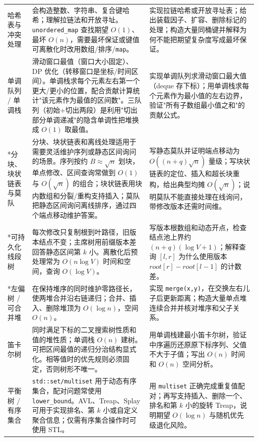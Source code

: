 \documentclass[a4paper,11pt]{article}
\newcommand{\code}[1]{\texttt{#1}}
\begin{document}
\begin{longtable}{L{2.4cm} L{7.5cm} L{6.8cm}}
哈希表与冲突处理
& 会构造整数、字符串、复合键哈希；理解拉链法和开放寻址。\code{unordered\_map} 查找期望 $O(1)$、最坏 $O(n)$，需要最坏保证或键值可离散化时改用数组/排序/\code{map}。
& 实现拉链哈希或开放寻址表；给出装载因子、扩容、删除标记的处理；构造大量同桶键并解释为何不能把期望复杂度写成最坏保证。\\[2mm]

单调队列 / 单调栈
& 滑动窗口最值（窗口大小固定）、DP 优化（转移窗口是坐标/时间区间）。单调栈求每个元素左右第一个更大/更小的位置，配合贡献计算统计"该元素作为最值的区间数"。三队列（初始+切出两段）是利用"切出部分单调递减"的隐含单调性把堆换成 $O(1)$ 取最值。
& 实现单调队列求滑动窗口最大值（deque 存下标）；用单调栈求每个元素作为最小值的左右边界，验证"所有子数组最小值之和"的贡献公式。\\[2mm]

*分块、块状链表与莫队
& 分块、块状链表和离线处理适用于需要灵活维护序列或静态区间询问的场景。序列按约 $B\approx\sqrt n$ 划块，单点修改、区间查询常做到 $O(1)$ 与 $O(\sqrt n)$ 的组合；块状链表用块内数组和分裂/重构支持插入；莫队把静态区间询问离线排序，通过四个端点移动维护答案。
& 写静态莫队并证明端点移动为 $O((n+q)\sqrt n)$ 量级；写块状链表的定位、插入和超长块重构，给出典型均摊 $O(\sqrt n)$；说明莫队不能直接处理在线询问，带修改版本还需时间维。\\[2mm]

*可持久化线段树
& 每次修改只复制根到叶路径，旧版本结点不变；主席树用前缀版本差回答静态区间第 $k$ 小。离散化后预处理常为 $O(n\log V)$ 时间和空间，查询 $O(\log V)$。
& 写版本根数组和动态开点，检查结点池上界约 $(n+q)(\log V+1)$；解释查询 $[l,r]$ 为什么使用版本 $root[r]-root[l-1]$ 的计数差。\\[2mm]

*左偏树 / 可合并堆
& 在保持堆序的同时维护零路径长，使两堆合并沿右链递归；合并、插入、删除堆顶为 $O(\log n)$，空间 $O(n)$。
& 实现 \code{merge(x,y)}，在交换左右儿子后更新距离；构造大量单点堆连续合并并核对堆序和父子关系。\\[2mm]

笛卡尔树
& 同时满足下标的二叉搜索树性质和值的堆性质；单调栈 $O(n)$ 建树。可把区间最值的递归分治结构显式化。相等值时的优先规则必须固定，否则树形不唯一。
& 用单调栈建最小笛卡尔树，验证中序遍历还原原下标序列、父值不大于子值；写出 $O(n)$ 时间和 $O(n)$ 空间分析。\\[2mm]

平衡树 / 有序集合
& \code{std::set/multiset} 用于动态有序集合，配对问题常使用 \code{lower\_bound}。AVL、Treap、Splay 可用于实现排名、第 $k$ 小或自定义聚合信息；仅需有序集合操作时可使用 STL。
& 用 \code{multiset} 正确完成重复值配对；再写支持插入、删除一个、排名和第 $k$ 小的旋转 Treap，说明期望 $O(\log n)$ 与随机优先级退化风险。\\
\end{longtable}
\end{document}
